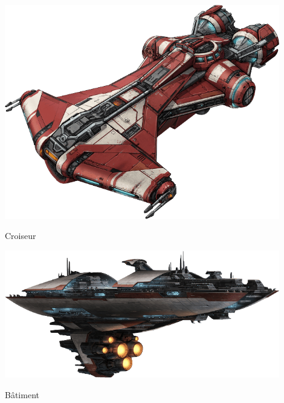 \onecolumn
\begin{center}
    \vspace*{\fill}
    \includegraphics[width=0.9\textwidth]{img/equipement/croiseur.png}
    \caption{Croiseur}
    \vspace*{\fill}
    \includegraphics[width=0.9\textwidth]{img/equipement/batiment.png}
    \caption{Bâtiment}
    \vspace*{\fill}
\end{center}
\twocolumn